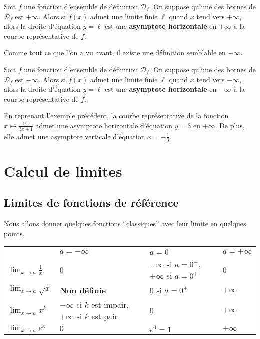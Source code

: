 	\begin{formula}
		Soit $f$ une fonction d'ensemble de définition $\mathcal{D}_f$. On suppose qu'une des bornes de $\mathcal{D}_f$ est $+\infty$.
		\newpar
		Alors si $f(x)$ admet une limite finie $\ell$ quand $x$ tend vers $+\infty$, alors la droite d'équation $y = \ell$ est une \textbf{asymptote horizontale} en $+\infty$ à la courbe représentative de $f$.
	\end{formula}
	
	Comme tout ce que l'on a vu avant, il existe une définition semblable en $-\infty$.
	
	\begin{tip}
		Soit $f$ une fonction d'ensemble de définition $\mathcal{D}_f$. On suppose qu'une des bornes de $\mathcal{D}_f$ est $-\infty$.
		\newpar
		Alors si $f(x)$ admet une limite finie $\ell$ quand $x$ tend vers $-\infty$, alors la droite d'équation $y = \ell$ est une \textbf{asymptote horizontale} en $-\infty$ à la courbe représentative de $f$.
	\end{tip}
	
	\begin{tip}[Exemple]
		En reprenant l'exemple précédent, la courbe représentative de la fonction $x \mapsto \frac{9x}{3x+1}$ admet une asymptote horizontale d'équation $y=3$ en $+\infty$.
		\newpar
		De plus, elle admet une asymptote verticale d'équation $x=-\frac{1}{3}$.
	\end{tip}
	
	\section{Calcul de limites}
	
	\subsection{Limites de fonctions de référence}
	
	Nous allons donner quelques fonctions ``classiques'' avec leur limite en quelques points.
	
	\begin{formula}
		\colorbox{white}{%
			\begin{tabularx}{\textwidth}{|X|X|X|X|}
				\hline
				& $a = -\infty$ & $a = 0$ & $a = +\infty$ \\
				\hline
				$\lim_{x \rightarrow a} \frac{1}{x}$ & $0$ & $-\infty$ si $a = 0^-$, $+\infty$ si $a = 0^+$ & $0$ \\
				\hline
				$\lim_{x \rightarrow a} \sqrt{x}$ & \textbf{Non définie} & $0$ si $a = 0^+$ & $+\infty$ \\
				\hline
				$\lim_{x \rightarrow a} x^k$ & $-\infty$ si $k$ est impair, $+\infty$ si $k$ est pair & $0$ & $+\infty$ \\
				\hline
				$\lim_{x \rightarrow a} e^x$ & $0$ & $e^0 = 1$ & $+\infty$ \\
				\hline
			\end{tabularx}%
		}
	\end{formula}
	
